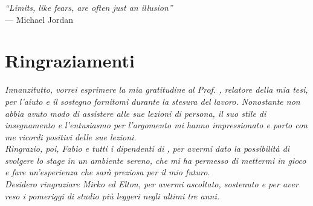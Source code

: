 
\cleardoublepage
{}
{}

\begin{flushright}{
		\slshape
		``Limits, like fears, are often just an illusion''} \\
	\medskip
	--- Michael Jordan
\end{flushright}

\bigskip

\begingroup
\let\clearpage\relax
\let\cleardoublepage\relax
\let\cleardoublepage\relax

\chapter*{Ringraziamenti}


\noindent \textit{Innanzitutto, vorrei esprimere la mia gratitudine al Prof.
	\myProf, relatore della mia tesi, per l'aiuto e il sostegno fornitomi
	durante
	la stesura del lavoro. Nonostante non abbia avuto modo di assistere
	alle sue
	lezioni di persona, il suo stile di insegnamento e l'entusiasmo per
	l'argomento
	mi hanno impressionato e porto con
	me ricordi positivi delle sue lezioni.}\\


\noindent \textit{Ringrazio, poi, Fabio e tutti i dipendenti di \myCompany, per
	avermi dato la possibilità di svolgere lo stage in un ambiente sereno,
	che		 mi ha permesso di mettermi in gioco e fare un'esperienza che
	sarà preziosa		   per il mio futuro.}\\

\noindent \textit{Desidero ringraziare Mirko ed Elton, per avermi ascoltato,
	sostenuto e per aver reso i pomeriggi di studio più leggeri negli
	ultimi tre
	anni.}\\

